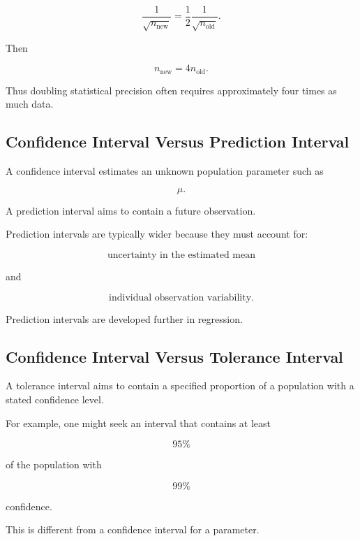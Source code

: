 \[
\frac1{\sqrt{n_{\text{new}}}}
=
\frac12
\frac1{\sqrt{n_{\text{old}}}}.
\]

Then

\[
\boxed{
n_{\text{new}}
=
4n_{\text{old}}.
}
\]

Thus doubling statistical precision often requires approximately four
times as much data.

\subsection{Confidence Interval Versus Prediction Interval}
\label{subsec:confidence-versus-prediction-interval}

A confidence interval estimates an unknown population parameter such as

\[
\mu.
\]

A prediction interval aims to contain a future observation.

Prediction intervals are typically wider because they must account for:

\[
\boxed{
\text{uncertainty in the estimated mean}
}
\]

and

\[
\boxed{
\text{individual observation variability}.
}
\]

Prediction intervals are developed further in regression.

\subsection{Confidence Interval Versus Tolerance Interval}
\label{subsec:confidence-versus-tolerance}

A tolerance interval aims to contain a specified proportion of a
population with a stated confidence level.

For example, one might seek an interval that contains at least

\[
95\%
\]

of the population with

\[
99\%
\]

confidence.

This is different from a confidence interval for a parameter.


